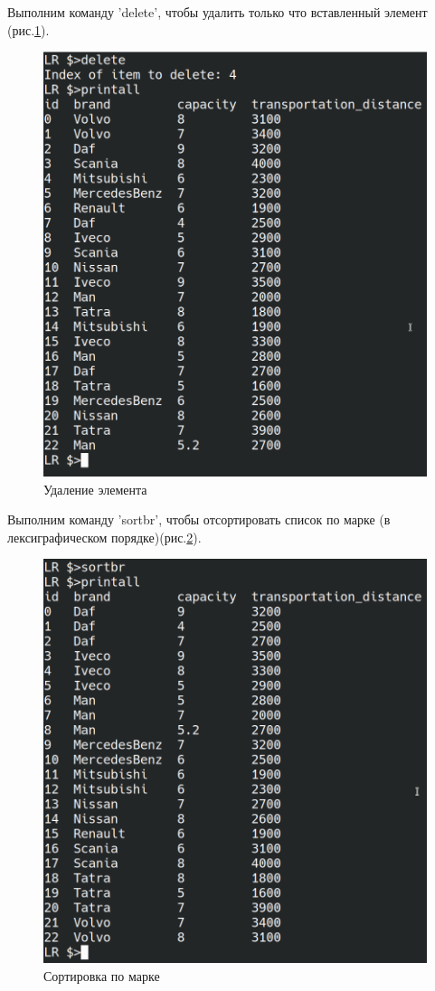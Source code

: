 Выполним команду 'delete', чтобы удалить только что вставленный элемент
(рис.\ref{test.delete}).

\begin{figure}[H]
    \centering
    \includegraphics[width=0.9\linewidth]{photo/test.delete}
    \caption{Удаление элемента}
    \label{test.delete}
\end{figure}

Выполним команду 'sortbr', чтобы отсортировать 
список по марке (в лексиграфическом порядке)(рис.\ref{test.sortbr}).

\begin{figure}[H]
    \centering
    \includegraphics[width=0.9\linewidth]{photo/test.sortbr}
    \caption{Сортировка по марке}
    \label{test.sortbr}
\end{figure}

